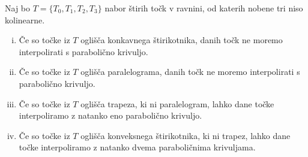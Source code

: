 \documentclass[mat1]{fmfdelo}
\begin{document}
\begin{izrek}\label{glavniizrek}
Naj bo $T = \{ T_0, T_1, T_2, T_3 \}$ nabor štirih točk v ravnini, od katerih nobene tri niso kolinearne.

\begin{enumerate}[i)]

\item Če so točke iz $T$ oglišča konkavnega štirikotnika, danih točk ne moremo interpolirati s parabolično krivuljo.

\item Če so točke iz $T$ oglišča paralelograma, danih točk ne moremo interpolirati s parabolično krivuljo.

\item Če so točke iz $T$ oglišča trapeza, ki ni paralelogram, lahko dane točke interpoliramo z natanko eno parabolično krivuljo.

\item Če so točke iz $T$ oglišča konveksnega štirikotnika, ki ni trapez, lahko dane točke interpoliramo z natanko dvema paraboličnima krivuljama.
\end{enumerate}

\end{izrek}
\end{document}
